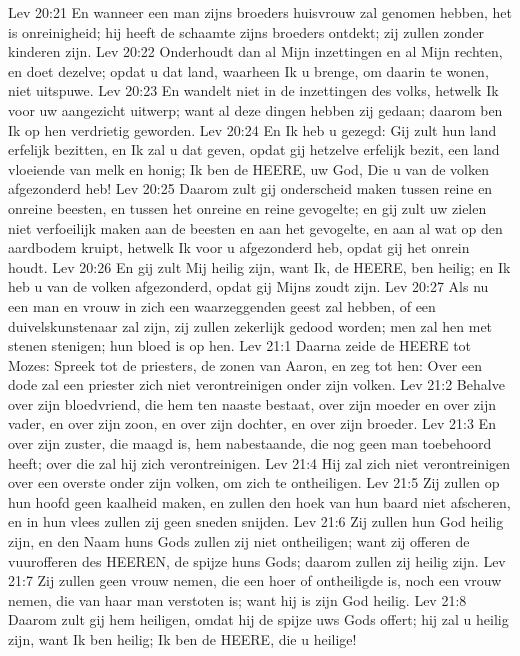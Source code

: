 Lev 20:21  En wanneer een man zijns broeders huisvrouw zal genomen hebben, het is onreinigheid; hij heeft de schaamte zijns broeders ontdekt; zij zullen zonder kinderen zijn.
Lev 20:22  Onderhoudt dan al Mijn inzettingen en al Mijn rechten, en doet dezelve; opdat u dat land, waarheen Ik u brenge, om daarin te wonen, niet uitspuwe.
Lev 20:23  En wandelt niet in de inzettingen des volks, hetwelk Ik voor uw aangezicht uitwerp; want al deze dingen hebben zij gedaan; daarom ben Ik op hen verdrietig geworden.
Lev 20:24  En Ik heb u gezegd: Gij zult hun land erfelijk bezitten, en Ik zal u dat geven, opdat gij hetzelve erfelijk bezit, een land vloeiende van melk en honig; Ik ben de HEERE, uw God, Die u van de volken afgezonderd heb!
Lev 20:25  Daarom zult gij onderscheid maken tussen reine en onreine beesten, en tussen het onreine en reine gevogelte; en gij zult uw zielen niet verfoeilijk maken aan de beesten en aan het gevogelte, en aan al wat op den aardbodem kruipt, hetwelk Ik voor u afgezonderd heb, opdat gij het onrein houdt.
Lev 20:26  En gij zult Mij heilig zijn, want Ik, de HEERE, ben heilig; en Ik heb u van de volken afgezonderd, opdat gij Mijns zoudt zijn.
Lev 20:27  Als nu een man en vrouw in zich een waarzeggenden geest zal hebben, of een duivelskunstenaar zal zijn, zij zullen zekerlijk gedood worden; men zal hen met stenen stenigen; hun bloed is op hen.
Lev 21:1  Daarna zeide de HEERE tot Mozes: Spreek tot de priesters, de zonen van Aaron, en zeg tot hen: Over een dode zal een priester zich niet verontreinigen onder zijn volken.
Lev 21:2  Behalve over zijn bloedvriend, die hem ten naaste bestaat, over zijn moeder en over zijn vader, en over zijn zoon, en over zijn dochter, en over zijn broeder.
Lev 21:3  En over zijn zuster, die maagd is, hem nabestaande, die nog geen man toebehoord heeft; over die zal hij zich verontreinigen.
Lev 21:4  Hij zal zich niet verontreinigen over een overste onder zijn volken, om zich te ontheiligen.
Lev 21:5  Zij zullen op hun hoofd geen kaalheid maken, en zullen den hoek van hun baard niet afscheren, en in hun vlees zullen zij geen sneden snijden.
Lev 21:6  Zij zullen hun God heilig zijn, en den Naam huns Gods zullen zij niet ontheiligen; want zij offeren de vuurofferen des HEEREN, de spijze huns Gods; daarom zullen zij heilig zijn.
Lev 21:7  Zij zullen geen vrouw nemen, die een hoer of ontheiligde is, noch een vrouw nemen, die van haar man verstoten is; want hij is zijn God heilig.
Lev 21:8  Daarom zult gij hem heiligen, omdat hij de spijze uws Gods offert; hij zal u heilig zijn, want Ik ben heilig; Ik ben de HEERE, die u heilige!
